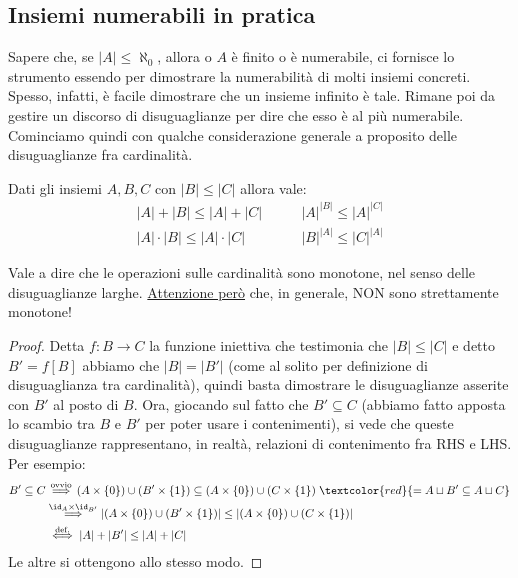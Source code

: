 \documentclass[11pt]{scrartcl}
\begin{document}
\subsection{Insiemi numerabili in pratica}
Sapere che, se $|A| \leq \aleph_0$, allora o $A$ è finito o è numerabile, ci fornisce lo strumento essendo per dimostrare la numerabilità di molti insiemi concreti. Spesso, infatti,
è facile dimostrare che un insieme infinito è tale. Rimane poi da gestire un discorso di disuguaglianze per dire che esso è al più numerabile.\\
Cominciamo quindi con qualche considerazione generale a proposito delle disuguaglianze fra cardinalità.

\begin{remark}
	Dati gli insiemi $A,B,C$ con $|B| \leq |C|$ allora vale:
	\begin{align*}
		|A| + |B| \leq |A| + |C| \qquad & |A|^{|B|} \leq |A|^{|C|} \\
		|A| \cdot |B| \leq |A| \cdot |C| \qquad & |B|^{|A|} \leq |C|^{|A|}
	\end{align*}
\end{remark}

Vale a dire che le operazioni sulle cardinalità sono monotone, nel senso delle disuguaglianze larghe. \underline{Attenzione però} che, in generale, NON sono strettamente monotone!

\begin{proof}
	Detta $f : B \rightarrow C$ la funzione iniettiva che testimonia che $|B| \leq |C|$ e detto $B' = f[B]$ abbiamo che $|B| = |B'|$ (come al solito per definizione di disuguaglianza
	tra cardinalità), quindi basta dimostrare le disuguaglianze asserite con $B'$ al posto di $B$. Ora, giocando sul fatto che $B' \subseteq C$ (abbiamo fatto apposta lo scambio tra $B$ e $B'$ per poter usare i contenimenti),
	si vede che queste disuguaglianze rappresentano, in realtà, relazioni di contenimento fra RHS e LHS. Per esempio:
	\[ \begin{split}
		B' \subseteq C &\overset{\text{ovvio}}{\implies} (A \times \{0\}) \cup (B' \times \{1\}) \subseteq (A \times \{0\}) \cup (C \times \{1\}) \; \textcolor{red}{= A \sqcup B' \subseteq A \sqcup C}\\
					   &\overset{\id_A \times \id_{B'}}{\implies} |(A \times \{0\}) \cup (B' \times \{1\})| \leq |(A \times \{0\}) \cup (C \times \{1\})| \\
					   &\overset{\text{def.}}{\iff}|A| + |B'| \leq |A| + |C|
	\end{split}
		\]
	Le altre si ottengono allo stesso modo.
\end{proof}
\end{document}
